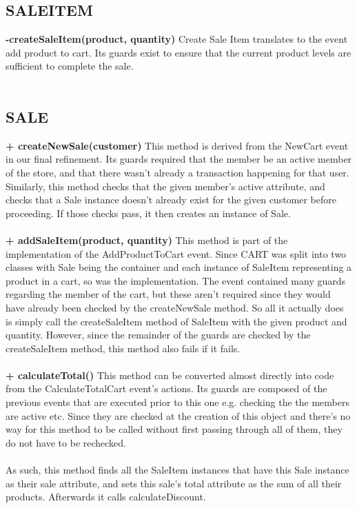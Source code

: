 \documentclass[a4paper]{article}
\begin{document}
\subsection{SALEITEM}
{\bf -createSaleItem(product, quantity)}
Create Sale Item translates to the event add product to cart. Its guards exist to ensure that the current product levels are sufficient to complete the sale.
\\\\
\subsection{SALE}
{\bf + createNewSale(customer)}
This method is derived from the NewCart event in our final refinement. Its guards required that the member be an active member of the store, and that there wasn’t already a transaction happening for that user. Similarly, this method checks that the given member’s active attribute, and checks that a Sale instance doesn’t already exist for the given customer before proceeding. If those checks pass, it then creates an instance of Sale.
\\\\
{\bf + addSaleItem(product, quantity)}
This method is part of the implementation of the AddProductToCart event. Since CART was split into two classes with Sale being the container and each instance of SaleItem representing a product in a cart, so was the implementation. The event contained many guards regarding the member of the cart, but these aren’t required since they would have already been checked by the createNewSale method. So all it actually does is simply call the createSaleItem method of SaleItem with the given product and quantity. However, since the remainder of the guards are checked by the createSaleItem method, this method also fails if it fails.
\\\\
{\bf + calculateTotal()}
This method can be converted almost directly into code from the CalculateTotalCart event’s actions. Its guards are composed of the previous events that are executed prior to this one e.g. checking the the members are active etc. Since they are checked at the creation of this object and there’s no way for this method to be called without first passing through all of them, they do not have to be rechecked.
\\\\
As such, this method finds all the SaleItem instances that have this Sale instance as their sale attribute, and sets this sale’s total attribute as the sum of all their products. Afterwards it calls calculateDiscount.
\end{document}
